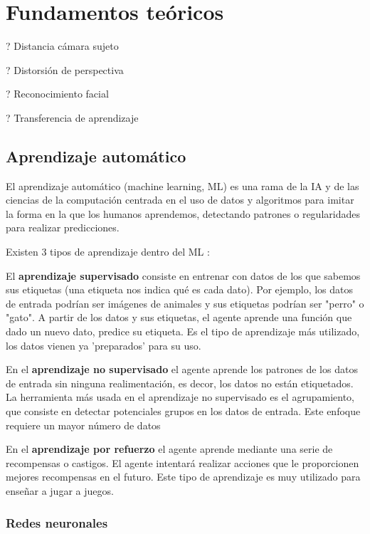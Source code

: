 \chapter{Fundamentos teóricos}
\thispagestyle{empty}

? Distancia cámara sujeto

? Distorsión de perspectiva

? Reconocimiento facial

? Transferencia de aprendizaje

\section{Aprendizaje automático}
El aprendizaje automático (machine learning, ML) \cite{16,17} es una rama de la IA y de las ciencias de la computación centrada en el uso de datos y algoritmos para imitar la forma en la que los humanos aprendemos, detectando patrones o regularidades para realizar predicciones.

Existen 3 tipos de aprendizaje dentro del ML \cite{18,19}:

El \textbf{aprendizaje supervisado} consiste en entrenar con datos de los que sabemos sus etiquetas (una etiqueta nos indica qué es cada dato). Por ejemplo, los datos de entrada podrían ser imágenes de animales y sus etiquetas podrían ser "perro" o "gato". A partir de los datos y sus etiquetas, el agente aprende una función que dado un nuevo dato, predice su etiqueta. Es el tipo de aprendizaje más utilizado, los datos vienen ya 'preparados' para su uso.

En el \textbf{aprendizaje no supervisado} el agente aprende los patrones de los datos de entrada sin ninguna realimentación, es decor, los datos no están etiquetados. La herramienta más usada en el aprendizaje no supervisado es el agrupamiento, que consiste en detectar potenciales grupos en los datos de entrada. Este enfoque requiere un mayor número de datos

En el \textbf{aprendizaje por refuerzo} el agente aprende mediante una serie de recompensas o castigos. El agente intentará realizar acciones que le proporcionen mejores recompensas en el futuro. Este tipo de aprendizaje es muy utilizado para enseñar a jugar a juegos.



\subsection{Redes neuronales}

